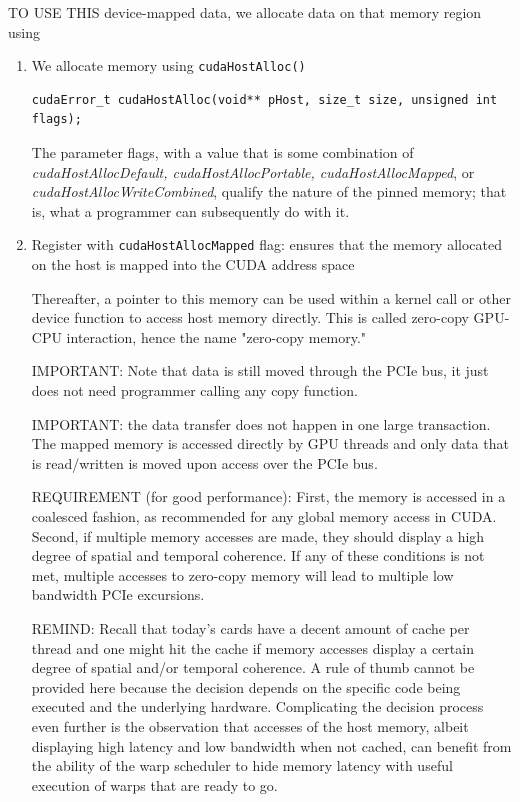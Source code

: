 TO USE THIS device-mapped data, we allocate data on that memory region using
\begin{enumerate}
  \item We allocate memory using \verb!cudaHostAlloc()! 
  
\begin{verbatim}
cudaError_t cudaHostAlloc(void** pHost, size_t size, unsigned int flags);
\end{verbatim}  

The parameter flags, with a value that is some combination of
{\it cudaHostAllocDefault, cudaHostAllocPortable, cudaHostAllocMapped}, or
{\it cudaHostAllocWriteCombined}, qualify the nature of the pinned memory; that is,
what a programmer can subsequently do with it.
  
  
  \item Register with \verb!cudaHostAllocMapped! flag:
  ensures that the memory allocated on the host is mapped into the CUDA address space
  
  Thereafter, a pointer to this memory can be used within a kernel call or other device function to access host memory directly.
  This is called zero-copy GPU-CPU interaction, hence the name "zero-copy memory." 
  
  IMPORTANT: Note that data is still moved through the PCIe bus, it just does not need programmer calling any copy function.
  
  IMPORTANT: the data transfer does not happen in one large transaction. The
  mapped memory is accessed directly by GPU threads and only data that is
  read/written is moved upon access over the PCIe bus.
  
  REQUIREMENT (for good performance): First, the memory is accessed in a
  coalesced fashion, as recommended for any global memory access in CUDA.
  Second, if multiple memory accesses are made, they should display a high
  degree of spatial and temporal coherence. If any of these conditions is not
  met, multiple accesses to zero-copy memory will lead to multiple low bandwidth
  PCIe excursions.
  
  REMIND: Recall that today's cards have a decent amount of cache per thread and
  one might hit the cache if memory accesses display a certain degree of spatial
  and/or temporal coherence. A rule of thumb cannot be provided here because the
  decision depends on the specific code being executed and the underlying
  hardware. Complicating the decision process even further is the observation
  that accesses of the host memory, albeit displaying high latency and low
  bandwidth when not cached, can benefit from the ability of the warp scheduler
  to hide memory latency with useful execution of warps that are ready to go.
  

\end{enumerate}
